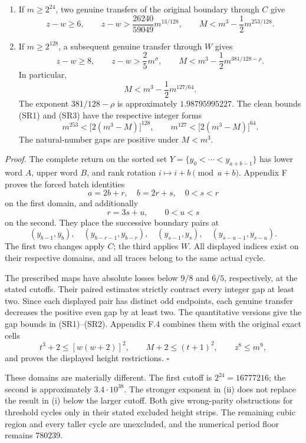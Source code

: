 \documentclass[12pt]{article}
\begin{document}
\begin{enumerate}
\def\labelenumi{(\roman{enumi})}
\item
  If \(m\ge2^{24}\), two genuine transfers of the original boundary
  through \(C\) give \[
  z-w\ge6,\qquad
  z-w>\frac{26240}{59049}m^{13/128},
  \qquad
  M<m^3-\frac{1}{2}m^{253/128}.
  \tag{SR1}
  \]
\item
  If \(m\ge2^{128}\), a subsequent genuine transfer through \(W\) gives
  \[
  z-w\ge8,\qquad z-w>\frac25m^\sigma,
  \qquad
  M<m^3-\frac{1}{2}m^{381/128-\rho}.
  \tag{SR2}
  \] In particular, \[
  M<m^3-\frac{1}{2}m^{127/64}.
  \tag{SR3}
  \] The exponent \(381/128-\rho\) is approximately \(1.98795995227\).
  The clean bounds (SR1) and (SR3) have the respective integer forms \[
  m^{253}<\bigl[2(m^3-M)\bigr]^{128},\qquad
  m^{127}<\bigl[2(m^3-M)\bigr]^{64}.
  \] The natural-number gaps are positive under \(M<m^3\).
\end{enumerate}

\emph{Proof.} The complete return on the sorted set
\(Y=\{y_0<\cdots<y_{a+b-1}\}\) has lower word \(A\), upper word \(B\),
and rank rotation \(i\mapsto i+b\pmod{a+b}\). Appendix F proves the
forced batch identities \[
a=2b+r,\quad b=2r+s,\quad 0<s<r
\] on the first domain, and additionally \[
r=3s+u,\qquad 0<u<s
\] on the second. They place the successive boundary pairs at \[
(y_{b-1},y_b),\quad
(y_{b-r-1},y_{b-r}),\quad
(y_{s-1},y_s),\quad
(y_{s-u-1},y_{s-u}).
\] The first two changes apply \(C\); the third applies \(W\). All
displayed indices exist on their respective domains, and all traces
belong to the same actual cycle.

The prescribed maps have absolute losses below \(9/8\) and \(6/5\),
respectively, at the stated cutoffs. Their paired estimates strictly
contract every integer gap at least two. Since each displayed pair has
distinct odd endpoints, each genuine transfer decreases the positive
even gap by at least two. The quantitative versions give the gap bounds
in (SR1)--(SR2). Appendix F.4 combines them with the original exact
cells \[
t^3+2\le[w(w+2)]^2,\qquad M+2\le(t+1)^2,\qquad z^8\le m^9,
\] and proves the displayed height restrictions. \(\square\)

These domains are materially different. The first cutoff is
\(2^{24}=16777216\); the second is approximately \(3.4\cdot10^{38}\).
The stronger exponent in (ii) does not replace the result in (i) below
the larger cutoff. Both give wrong-parity obstructions for threshold
cycles only in their stated excluded height strips. The remaining cubic
region and every taller cycle are unexcluded, and the numerical period
floor remains \(780239\).
\end{document}
